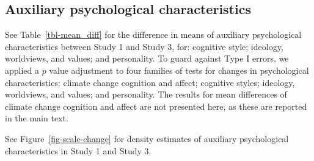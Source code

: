 \documentclass[
  letterpaper,
  DIV=11,
  numbers=noendperiod]{scrartcl}
\begin{document}
\clearpage

\subsection{Auxiliary psychological
characteristics}\label{auxiliary-psychological-characteristics}

See Table~\ref{tbl-mean_diff} for the difference in means of auxiliary
psychological characteristics between Study 1 and Study 3, for:
cognitive style; ideology, worldviews, and values; and personality. To
guard against Type I errors, we applied a \citeyearpar{holm1979} \(p\)
value adjustment to four families of tests for changes in psychological
characteristics: climate change cognition and affect; cognitive styles;
ideology, worldviews, and values; and personality. The results for mean
differences of climate change cognition and affect are not presented
here, as these are reported in the main text.

See Figure~\ref{fig-scale-change} for density estimates of auxiliary
psychological characteristics in Study 1 and Study 3.
\end{document}
